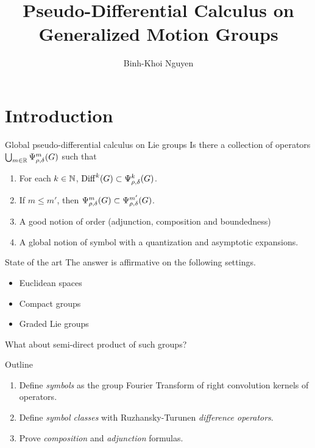 \documentclass{beamer}
\title{Pseudo-Differential Calculus on Generalized Motion Groups}
\author{Binh-Khoi Nguyen}
\begin{document}
\maketitle

\section{Introduction}

\begin{frame}{Global pseudo-differential calculus on Lie groups}
    Is there a collection of operators $\bigcup_{m \in \mathbb{R}} \Psi^{m}_{\rho, \delta}(G)$ such that
    \begin{enumerate}
        \item
            For each $k \in \mathbb{N}$,
            $\mathrm{Diff}^k(G) \subset \Psi^{k}_{\rho, \delta}(G)$.
            \pause
        \item
            If $m \leq m'$,
            then $\Psi^{m}_{\rho, \delta}(G) \subset \Psi^{m'}_{\rho, \delta}(G)$.
            \pause
        \item
            A good notion of order (adjunction, composition and boundedness)
            \pause
        \item
            A global notion of symbol with a quantization and asymptotic expansions.
    \end{enumerate}
\end{frame}

\begin{frame}{State of the art}
    The answer is affirmative on the following settings.

    \begin{itemize}
        \item Euclidean spaces
            \pause
        \item Compact groups \cite{RuzhanskyTurunen10}
            \pause
        \item Graded Lie groups \cite{FischerRuzhansky16}
            \pause
    \end{itemize}

    What about semi-direct product of such groups?
\end{frame}

\begin{frame}{Outline}
    \begin{enumerate}
        \item Define \emph{symbols} as the group Fourier Transform of right convolution kernels of operators.
            \pause
        \item Define \emph{symbol classes} with Ruzhansky-Turunen \emph{difference operators}.
            \pause
        \item Prove \emph{composition} and \emph{adjunction} formulas.
    \end{enumerate}
\end{frame}
\end{document}
